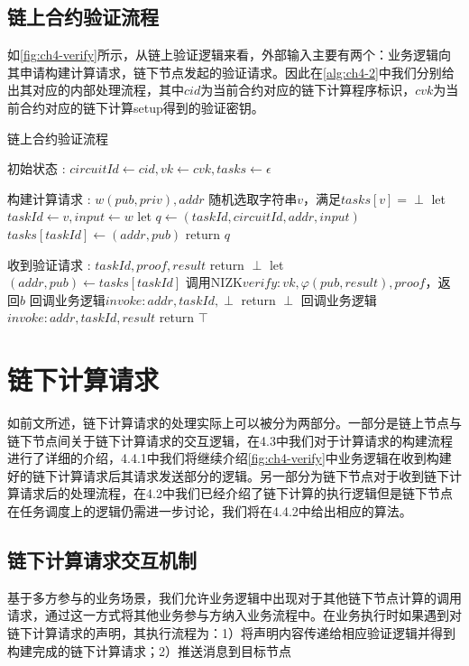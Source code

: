 \subsection{链上合约验证流程}
如\autoref{fig:ch4-verify}所示，从链上验证逻辑来看，外部输入主要有两个：业务逻辑向其申请构建计算请求，链下节点发起的验证请求。因此在\autoref{alg:ch4-2}中我们分别给出其对应的内部处理流程，其中$cid$为当前合约对应的链下计算程序标识，$cvk$为当前合约对应的链下计算setup得到的验证密钥。
\begin{breakablealgorithm}
    \caption{链上合约验证流程}
    \label{alg:ch4-2}
    \begin{algorithmic} 
    \item [初始状态]: $circuitId \leftarrow cid, vk \leftarrow cvk, tasks \leftarrow \epsilon$
    \item [构建计算请求]: $w(pub, priv), addr$
    \STATE 随机选取字符串$v$，满足$tasks[v] = \perp$
    \STATE let $taskId \leftarrow v, input \leftarrow w$
    \STATE let $q \leftarrow (taskId, circuitId, addr, input)$
    \STATE $tasks[taskId] \leftarrow (addr, pub)$
    \STATE return $q$
    \item [收到验证请求]: $taskId, proof, result$
    \STATE return $\perp$
    \ENDIF
    \STATE let $(addr, pub) \leftarrow tasks[taskId]$
    \STATE 调用NIZK$verify: vk, \varphi(pub, result), proof$，返回$b$
    \STATE 回调业务逻辑$invoke: addr, taskId, \perp$
    \STATE return $\perp$
    \ENDIF
    \STATE 回调业务逻辑$invoke: addr, taskId, result$
    \STATE return $\top$
    \end{algorithmic}
\end{breakablealgorithm}

\section{链下计算请求}
如前文所述，链下计算请求的处理实际上可以被分为两部分。一部分是链上节点与链下节点间关于链下计算请求的交互逻辑，在4.3中我们对于计算请求的构建流程进行了详细的介绍，4.4.1中我们将继续介绍\autoref{fig:ch4-verify}中业务逻辑在收到构建好的链下计算请求后其请求发送部分的逻辑。另一部分为链下节点对于收到链下计算请求后的处理流程，在4.2中我们已经介绍了链下计算的执行逻辑但是链下节点在任务调度上的逻辑仍需进一步讨论，我们将在4.4.2中给出相应的算法。
\subsection{链下计算请求交互机制}
基于多方参与的业务场景，我们允许业务逻辑中出现对于其他链下节点计算的调用请求，通过这一方式将其他业务参与方纳入业务流程中。在业务执行时如果遇到对链下计算请求的声明，其执行流程为：1）将声明内容传递给相应验证逻辑并得到构建完成的链下计算请求；2）推送消息到目标节点


